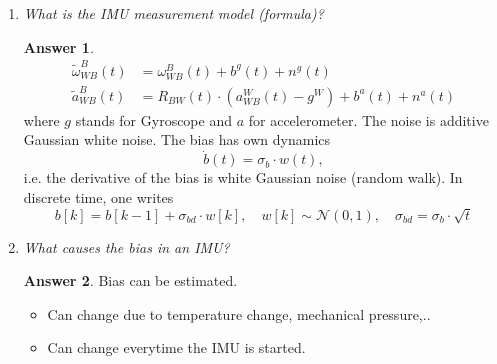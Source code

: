 \documentclass[a4paper,12 pt]{article}
\theoremstyle{definition}
\theoremstyle{remark}
\theoremstyle{definition}
\theoremstyle{definition}
\theoremstyle{definition}
\theoremstyle{definition}
\theoremstyle{remark}
\theoremstyle{remark}
\theoremstyle{definition}
\theoremstyle{definition}
\newtheorem*{answer}{Answer}
\begin{document}
\begin{enumerate}
\item \textit{What is the IMU measurement model (formula)? }
\begin{answer}
\begin{equation}
\begin{split}
\tilde{\omega}_{WB}^B(t)&=\omega_{WB}^B(t)+b^g(t)+n^g(t)\\
\tilde{a}_{WB}^B(t)&=R_{BW}(t)\cdot \left(a_{WB}^W(t)-g^W \right) + b^a(t)+n^a(t)
\end{split}
\end{equation}
where $g$ stands for Gyroscope and $a$ for accelerometer. The noise is additive Gaussian white noise. The bias has own dynamics
\begin{equation}
\dot{b}(t)=\sigma_b\cdot w(t),
\end{equation}
i.e. the derivative of the bias is white Gaussian noise (random walk). In discrete time, one writes
\begin{equation}
b[k]=b[k-1]+\sigma_{bd}\cdot w[k], \quad w[k]\sim \mathcal{N}(0,1), \quad \sigma_{bd}=\sigma_b\cdot \sqrt{t}
\end{equation}
\end{answer}
\item \textit{ What causes the bias in an IMU?}
\begin{answer}
Bias can be estimated.
\begin{itemize}
\item Can change due to temperature change, mechanical pressure,..
\item Can change everytime the IMU is started.
\end{itemize}


\end{answer}
\end{enumerate}
\end{document}
